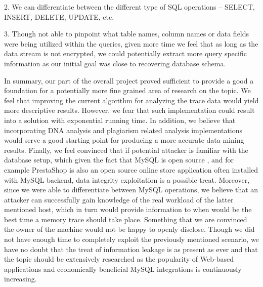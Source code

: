 \documentclass[11pt,a4paper, titlepage, oneside]{article}
\begin{document}
2. We can differentiate between the different type of SQL operations – SELECT, INSERT, DELETE, UPDATE, etc.
      
3. Though not able to pinpoint what table names, column names or data fields were being utilized within the queries, given more time we feel that as long as the data stream is not encrypted, we could potentially extract more query specific information as our initial goal was close to recovering database schema.

In summary, our part of the overall project proved sufficient to provide a good a foundation for a potentially more fine grained area of research on the topic. We feel that improving the current algorithm for analyzing the trace data would yield more descriptive results. However, we fear that such implementation could result into a solution with exponential running time. In addition, we believe that incorporating DNA analysis and plagiarism related analysis implementations would serve a good starting point for producing a more accurate data mining results. Finally, we feel convinced that if potential attacker is familiar with the database setup, which given the fact that MySQL is open source , and for example PrestaShop is also an open source online store application often installed with MySQL backend, data integrity exploitation is a possible treat. Moreover, since we were able to differentiate between MySQL operations, we believe that an attacker can successfully gain knowledge of the real workload of the latter mentioned host, which in turn would provide information to when would be the best time a memory trace should take place. Something that we are convinced the owner of the machine would not be happy to openly disclose. Though we did not have enough time to completely exploit the previously mentioned scenario, we have no doubt that the treat of information leakage is as present as ever and that the topic should be extensively researched as the popularity of Web-based applications and economically beneficial MySQL integrations is continuously increasing.
\end{document}
